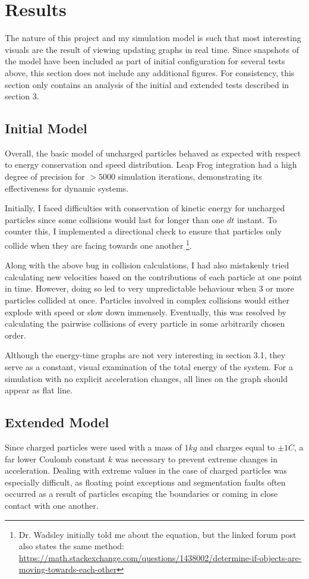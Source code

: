 \documentclass{article}
\begin{document}
\section{Results}
The nature of this project and my simulation model is such that most interesting visuals
are the result of viewing updating graphs in real time.
Since snapshots of the model have been included as part of initial configuration for several tests above,
this section does not include any additional figures.
For consistency, this section only contains an analysis of the initial and extended tests described in section 3.

\subsection{Initial Model}
Overall, the basic model of uncharged particles behaved as expected
with respect to energy conservation and speed distribution.
Leap Frog integration had a high degree of precision for $>5000$ simulation iterations,
demonstrating its effectiveness for dynamic systems.

Initially, I faced difficulties with conservation of kinetic energy for uncharged particles
since some collisions would last for longer than one $dt$ instant.
To counter this, I implemented a directional check to ensure that particles only
collide when they are facing towards one another
\footnote{Dr. Wadsley initially told me about the equation, but the linked forum post also states the same method:
\url{https://math.stackexchange.com/questions/1438002/determine-if-objects-are-moving-towards-each-other}}.

Along with the above bug in collision calculations, I had also mistakenly tried calculating new velocities
based on the contributions of each particle at one point in time.
However, doing so led to very unpredictable behaviour when 3 or more particles collided at once.
Particles involved in complex collisions would either explode with speed or slow down immensely.
Eventually, this was resolved by calculating the pairwise collisions of every particle in some arbitrarily chosen order.

Although the energy-time graphs are not very interesting in section 3.1,
they serve as a constant, visual examination of the total energy of the system.
For a simulation with no explicit acceleration changes, all lines on the graph should appear as flat line.

\subsection{Extended Model}
Since charged particles were used with a mass of $1 kg$ and charges equal to $\pm 1 C$,
a far lower Coulomb constant $k$ was necessary to prevent extreme changes in acceleration.
Dealing with extreme values in the case of charged particles was especially difficult,
as floating point exceptions and segmentation faults often occurred as a result of
particles escaping the boundaries or coming in close contact with one another.
\end{document}
